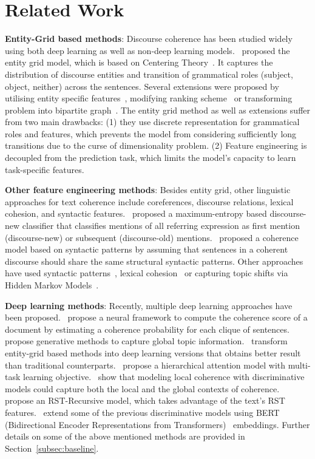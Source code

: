 \documentclass[11pt]{article}
\begin{document}
\section{Related Work}
\label{sec:related}
\noindent\textbf{Entity-Grid based methods}: Discourse coherence has been studied widely using both deep learning as well as non-deep learning models.~\cite{barzilay2008modeling} proposed the entity grid model, which is based on Centering Theory~\cite{grosz1995centering}. It captures the distribution of discourse entities and transition of grammatical roles (subject, object, neither) across the sentences. Several extensions were proposed by utilising entity specific features~\cite{elsner2008coreference}, modifying ranking scheme~\cite{feng2012extending} or transforming problem into bipartite graph~\cite{mesgar2015graph}. The entity grid method as well as extensions suffer from two main drawbacks: (1) they use discrete representation for grammatical roles and features, which prevents the model from considering sufficiently long transitions due to the curse of dimensionality problem. (2) Feature engineering is decoupled from the prediction task, which limits the model's capacity to learn task-specific features. 

\noindent\textbf{Other feature engineering methods}: Besides entity grid, other linguistic approaches for text coherence include coreferences, discourse relations, lexical cohesion, and syntactic features.~\cite{elsner2008coreference} proposed a maximum-entropy based discourse-new classifier that classifies mentions of all referring expression as first mention (discourse-new) or subsequent (discourse-old) mentions.~\cite{louis2012coherence} proposed a coherence model based on syntactic patterns by assuming that sentences in a coherent discourse should share the same structural syntactic patterns. Other approaches have used syntactic patterns~\cite{louis2012coherence}, lexical cohesion~\cite{morris1991lexical,somasundaran2014lexical} or capturing topic shifts via Hidden Markov Models~\cite{barzilay2004catching}.

\noindent\textbf{Deep learning methods}: Recently, multiple deep learning approaches have been proposed.~\cite{li2014model} propose a neural framework to compute the coherence score of a document by estimating a coherence probability for each clique of  sentences. \cite{li2017neural} propose generative methods to capture global topic information.~\cite{nguyen2017neural,mohiuddin2018coherence} transform entity-grid based methods into deep learning versions that obtains better result than traditional counterparts.~\cite{farag2019multi} propose a hierarchical attention model with multi-task learning objective.~\cite{xu2019cross,moon2019unified} show that modeling local coherence with discriminative models could capture both the local and the global contexts of coherence.~\cite{guz2020neural} propose an RST-Recursive model, which takes advantage of the text's RST features.~\cite{farag2020analyzing} extend some of the previous discriminative models using BERT (Bidirectional Encoder Representations from Transformers)~\cite{devlin2018bert} embeddings. Further details on some of the above mentioned methods are provided in Section~\ref{subsec:baseline}. 
\end{document}
